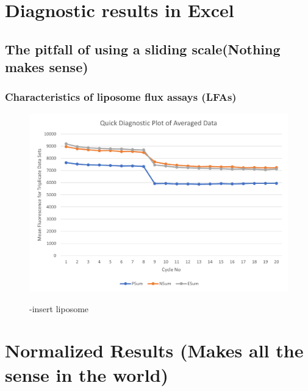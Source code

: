 \documentclass[10pt]{beamer}
\begin{document}
\section{Diagnostic results in Excel}

\subsection{The pitfall of using a sliding scale(Nothing makes sense)}
\begin{frame}
\label{Experimental set-up schematic}
\frametitle{Characteristics of liposome flux assays (LFAs)}
\begin{figure}
{\includegraphics[scale=0.6]{images/picture2.png}}
\caption{-insert liposome}
\end{figure}
\end{frame}


\section{Normalized Results (Makes all the sense in the world)}
\end{document}

